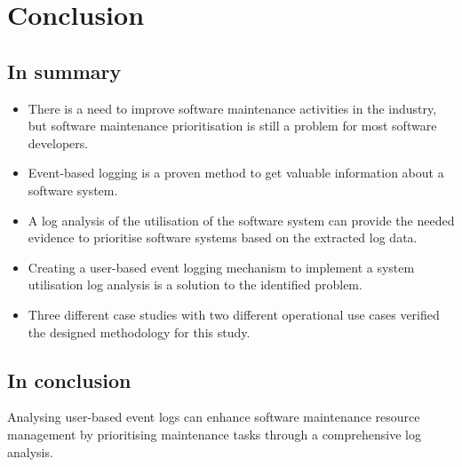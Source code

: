 \section{Conclusion}

\subsection{In summary}
\begin{itemize}
	\item There is a need to improve software maintenance activities in the industry, but software maintenance prioritisation is still a problem for most software developers.
	\item Event-based logging is a proven method to get valuable information about a software system.
	\item A log analysis of the utilisation of the software system can provide the needed evidence to prioritise software systems based on the extracted log data.
	\item Creating a user-based event logging mechanism to implement a system utilisation log analysis is a solution to the identified problem.
	\item Three different case studies with two different operational use cases verified the designed methodology for this study.
\end{itemize}

\subsection{In conclusion}
Analysing user-based event logs can enhance software maintenance resource management by prioritising maintenance tasks through a comprehensive log analysis.